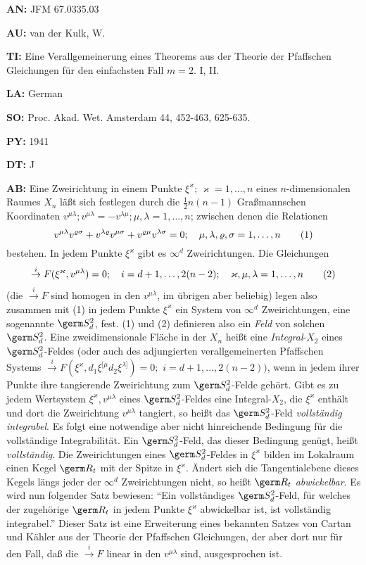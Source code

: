 \item{\bf AN:} JFM 67.0335.03
\item{\bf AU:} van der Kulk, W.
\item{\bf TI:} Eine Verallgemeinerung eines Theorems aus der
Theorie der Pfaffschen Gleichungen f\"ur den einfachsten Fall $m = 2$. I, II.
\item{\bf LA:} German
\item{\bf SO:} Proc. Akad. Wet. Amsterdam 44, 452-463, 625-635.
\item{\bf PY:} 1941
\item{\bf DT:} J
\item{\bf AB:}{\parindent15pt
 Eine Zweirichtung in einem Punkte $\xi^\varkappa$; $\varkappa = 1,\ldots, n$
 eines $n$-dimensionalen
Raumes $X_n$ l\"a{\ss}t sich festlegen durch die $\tfrac12n(n - 1)$ Gra{\ss}mannschen
Koordinaten
$v^{\mu\lambda}; v^{\mu\lambda}=-v^{\lambda\mu}; \mu, \lambda =1, \ldots , n$;
zwischen denen die Relationen
$$
v^{\mu\lambda}
v^{\varrho\sigma}+
v^{\lambda\varrho}v^{\mu\sigma}+v^{\varrho\mu} v^{\lambda\sigma}=0;
\quad \mu, \lambda, \varrho , \sigma =1, \ldots , n\tag1
$$
bestehen. In jedem Punkte $\xi^\varkappa$ gibt es $\infty^d$ Zweirichtungen. Die Gleichungen
$$
\overset{i}\to{F}(\xi^\varkappa, v^{\mu\lambda})=0; \quad i=d+1, \ldots, 2(n-2);
\quad \varkappa, \mu, \lambda =1, \ldots , n
\tag2
$$
(die $\overset{i}\to{F}$ sind homogen
in den $v^{\mu\lambda}$, im \"ubrigen aber beliebig) legen also zusammen mit (1)
in jedem Punkte $\xi^\varkappa$ ein System von $\infty^d$ Zweirichtungen, eine sogenannte
$\germ S_d^2$, fest.
(1) und (2) definieren
also ein {\it Feld} von solchen $\germ S_d^2$.
Eine zweidimensionale Fl\"ache
in der $X_n$ hei{\ss}t
eine {\it Integral}-$X_2$ eines $\germ S_d^2$-Feldes (oder auch des adjungierten
verallgemeinerten Pfaffschen
Systems $\overset{i}\to{F} (\xi^\varkappa, d_1\xi ^{[\mu}d_2 \xi^{\lambda]}) = 0;$
$i = d + 1,\ldots, 2 (n-2))$,
wenn in jedem ihrer Punkte ihre tangierende Zweirichtung zum
$\germ S_d^2$-Felde geh\"ort.
Gibt es zu jedem Wertsystem
$\xi^\varkappa, v^{\mu\lambda}$ eines
$\germ S_d^2$-Feldes eine Integral-$X_2$, die $\xi^\varkappa$ enth\"alt
und dort die Zweirichtung $v^{\mu\lambda}$ tangiert, so hei{\ss}t das
$\germ S_d^2$-Feld {\it vollst\"andig integrabel}.
Es folgt eine notwendige
aber nicht hinreichende Bedingung f\"ur die vollst\"andige
Integrabilit\"at. Ein
$\germ S_d^2$-Feld, das dieser Bedingung gen\"ugt, hei{\ss}t {\it vollst\"andig}. Die
Zweirichtungen eines $\germ S_d^2$-Feldes in $\xi^\varkappa$ bilden im Lokalraum einen Kegel
$\germ R_t$ mit der
Spitze in $\xi^\varkappa$. \"Andert
sich die Tangentialebene dieses Kegels l\"angs jeder der $\infty^d$
Zweirichtungen nicht,
so hei{\ss}t $\germ R_t$ {\it abwickelbar}.
Es wird nun folgender Satz bewiesen:
``Ein vollst\"andiges
$\germ S_d^2$-Feld, f\"ur welches der zugeh\"orige $\germ R_t$ in jedem Punkte
$\xi^\varkappa$
abwickelbar ist, ist
vollst\"andig integrabel.'' Dieser Satz ist eine Erweiterung eines bekannten
Satzes von Cartan und
K\"ahler aus der Theorie der Pfaffschen Gleichungen, der aber
dort nur f\"ur den Fall,
da{\ss} die $\overset{i}\to{F}$ linear in den $v^{\mu\lambda}$
sind, ausgesprochen ist.
}
